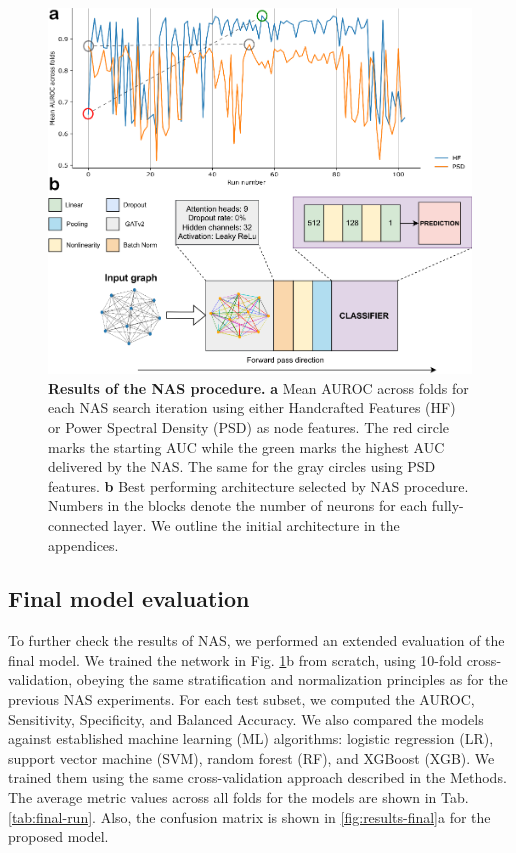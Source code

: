 \documentclass[a4paper,fleqn]{cas-sc}
\begin{document}
\begin{figure}
    \centering
    \includegraphics[width=\linewidth]{figures/Fig2.pdf}
    \caption{\textbf{Results of the NAS procedure.} \textbf{a} Mean AUROC across folds for each NAS search iteration using either Handcrafted Features (HF) or Power Spectral Density (PSD) as node features. The red circle marks the starting AUC while the green marks the highest AUC delivered by the NAS. The same for the gray circles using PSD features. \textbf{b} Best performing architecture selected by NAS procedure. Numbers in the blocks denote the number of neurons for each fully-connected layer. We outline the initial architecture in the appendices.}
    \label{fig:final-network}
\end{figure}

\subsection{Final model evaluation}
To further check the results of NAS, we performed an extended evaluation of the final model. We trained the network in Fig. \ref{fig:final-network}b from scratch, using 10-fold cross-validation, obeying the same stratification and normalization principles as for the previous NAS experiments. For each test subset, we computed the AUROC, Sensitivity, Specificity, and Balanced Accuracy. We also compared the models against established machine learning (ML) algorithms: logistic regression (LR), support vector machine (SVM), random forest (RF), and XGBoost (XGB). We trained them using the same cross-validation approach described in the Methods. The average metric values across all folds for the models are shown in Tab. \ref{tab:final-run}. Also, the confusion matrix is shown in \ref{fig:results-final}a for the proposed model. 
\end{document}
